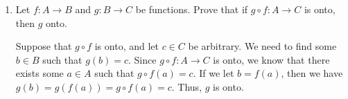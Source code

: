 \documentclass[12pt]{article}
\newcommand{\points}[1]{\marginpar{\hspace{24pt}[#1]}}
\begin{document}
\begin{enumerate}
\bigskip


\item Let $f:A\to B$ and $g:B\to C$ be functions. Prove that if $g\circ f :A\to C$ is onto, then $g$ onto. \points{2}

\bigskip

 Suppose that $g\circ f$ is onto, and let $c\in C$ be arbitrary. We need to find some $b\in B$ such that $g(b)=c$. Since $g\circ f:A\to C$ is onto, we know that there exists some $a\in A$ such that $g\circ f(a)=c$. If we let $b=f(a)$, then we have $g(b)=g(f(a))=g\circ f(a)=c$. Thus, $g$ is onto.

\bigskip

 \end{enumerate}
\end{document}
